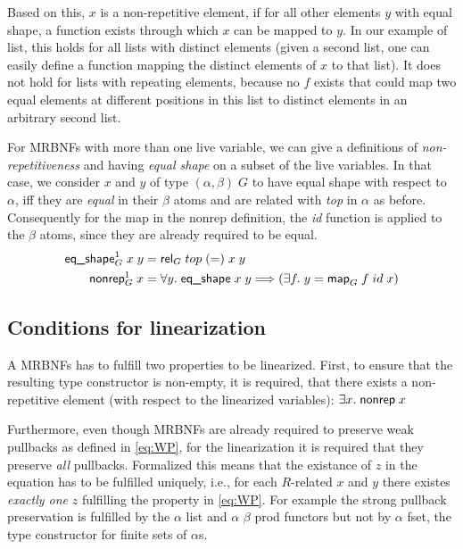     Based on this, $x$ is a non-repetitive element, if for all other elements $y$ with equal shape, a function exists through which $x$ can be mapped to $y$. In our example of \textsf{list}, this holds for all lists with distinct elements (given a second list, one can easily define a function mapping the distinct elements of $x$ to that list). It does not hold for lists with repeating elements, because no $f$ exists that could map two equal elements at different positions in this list to distinct elements in an arbitrary second list.

    For \acp{MRBNF} with more than one live variable, we can give a definitions of \textit{non-repetitiveness} and having \textit{equal shape} on a subset of the live variables. In that case, we consider $x$ and $y$ of type $(\alpha, \beta)\; G$ to have equal shape with respect to $\alpha$, iff they are \textit{equal} in their $\beta$ atoms and are related with \textit{top} in $\alpha$ as before. Consequently for the map in the \textsf{nonrep} definition, the \textit{id} function is applied to the $\beta$ atoms, since they are already required to be equal. 
    \begin{align}
      \text{\textsf{eq\_shape}}_G^1\; x\; y &= \text{\textsf{rel}}_G\; top\; (=)\; x\; y\\
      \text{\textsf{nonrep}}_G^1\; x &= \forall y.\; \text{\textsf{eq\_shape}}\; x\; y \Longrightarrow (\exists f.\; y = \text{\textsf{map}}_G\; f\; id\; x)
    \end{align}
    
    
  \subsection{Conditions for linearization}
  \label{subsec:conditions}
    A \acp{MRBNF} has to fulfill two properties to be linearized. First, to ensure that the resulting type constructor is non-empty, it is required, that there exists a non-repetitive element (with respect to the linearized variables): $\exists x.\; \text{\textsf{nonrep}}\; x$

    Furthermore, even though \acp{MRBNF} are already required to preserve weak pullbacks as defined in \autoref{eq:WP}, for the linearization it is required that they preserve \textit{all} pullbacks. Formalized this means that the existance of $z$ in the equation has to be fulfilled uniquely, i.e., for each $R$-related $x$ and $y$ there existes \textit{exactly one} $z$ fulfilling the property in \autoref{eq:WP}. For example the strong pullback preservation is fulfilled by the \textsf{$\alpha$ list} and \textsf{$\alpha$ $\beta$ prod} functors but not by \textsf{$\alpha$ fset}, the type constructor for finite sets of $\alpha$s. 

